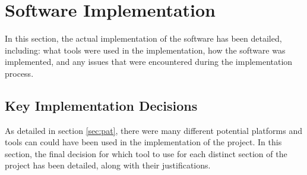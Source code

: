 \section{Software Implementation}
In this section, the actual implementation of the software has been detailed, including: what tools were used in the implementation, how the software was implemented, and any issues that were encountered during the implementation process.



\subsection{Key Implementation Decisions}
\label{sec:kid}
As detailed in section \ref{sec:pat}, there were many different potential platforms and tools can could have been used in the implementation of the project. In this section, the final decision for which tool to use for each distinct section of the project has been detailed, along with their justifications.

